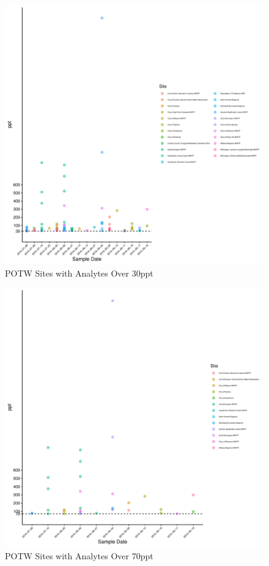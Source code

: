 \documentclass[
  12pt,
]{article}
\begin{document}
\begin{figure}

\includegraphics{PFAS_FinalProject_files/figure-latex/unnamed-chunk-16-1} \hfill{}

\caption{POTW Sites with Analytes Over 30ppt}\label{fig:unnamed-chunk-16}
\end{figure}

\begin{figure}

\includegraphics{PFAS_FinalProject_files/figure-latex/unnamed-chunk-17-1} \hfill{}

\caption{POTW Sites with Analytes Over 70ppt}\label{fig:unnamed-chunk-17}
\end{figure}
\end{document}

